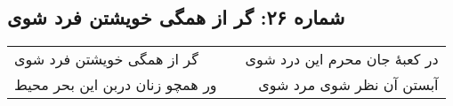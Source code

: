 \begin{center}
\section*{شماره ۲۶: گر از همگی خویشتن فرد شوی}
\label{sec:026}
\begin{longtable}{l p{0.5cm} r}
گر از همگی خویشتن فرد شوی
&&
در کعبهٔ جان محرم این درد شوی
\\
ور همچو زنان دربن این بحر محیط
&&
آبستن آن نظر شوی مرد شوی
\\
\end{longtable}
\end{center}
